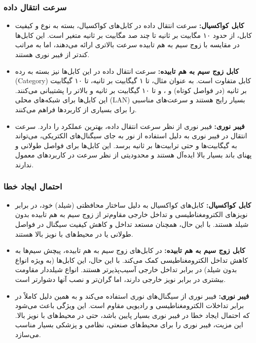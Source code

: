 

\subsubsection*{سرعت انتقال داده}

\begin{itemize}
	\item \textbf{کابل کواکسیال:} سرعت انتقال داده در کابل‌های کواکسیال، بسته به نوع و کیفیت کابل، از حدود ۱۰ مگابیت بر ثانیه تا چند صد مگابیت بر ثانیه متغیر است. این کابل‌ها در مقایسه با زوج سیم به هم تابیده سرعت بالاتری ارائه می‌دهند، اما به مراتب کندتر از فیبر نوری هستند.
	
	\item \textbf{کابل زوج سیم به هم تابیده:} سرعت انتقال داده در این کابل‌ها نیز بسته به رده (Category) کابل متفاوت است. به عنوان مثال،  تا ۱ گیگابیت بر ثانیه،  تا ۱۰ گیگابیت بر ثانیه (در فواصل کوتاه) و ،  و  تا ۱۰ گیگابیت بر ثانیه و بالاتر را پشتیبانی می‌کنند. این کابل‌ها برای شبکه‌های محلی (LAN) بسیار رایج هستند و سرعت‌های مناسبی را برای بسیاری از کاربردها فراهم می‌کنند.
	
	\item \textbf{فیبر نوری:} فیبر نوری از نظر سرعت انتقال داده، بهترین عملکرد را دارد. سرعت انتقال در فیبر نوری به دلیل استفاده از نور به جای سیگنال‌های الکتریکی، می‌تواند به گیگابیت‌ها و حتی ترابیت‌ها بر ثانیه برسد. این کابل‌ها برای فواصل طولانی و پهنای باند بسیار بالا ایده‌آل هستند و محدودیتی از نظر سرعت در کاربردهای معمول ندارند.
\end{itemize}

\subsubsection*{احتمال ایجاد خطا}

\begin{itemize}
	\item \textbf{کابل کواکسیال:} کابل‌های کواکسیال به دلیل ساختار محافظتی (شیلد) خود، در برابر نویزهای الکترومغناطیسی و تداخل خارجی مقاوم‌تر از زوج سیم به هم تابیده بدون شیلد هستند. با این حال، همچنان مستعد تداخل و کاهش کیفیت سیگنال در فواصل طولانی یا در محیط‌های با نویز بالا هستند.
	
	\item \textbf{کابل زوج سیم به هم تابیده:} در کابل‌های زوج سیم به هم تابیده، پیچش سیم‌ها به کاهش تداخل الکترومغناطیسی کمک می‌کند. 
	با این حال، این کابل‌ها (به ویژه انواع بدون شیلد) در برابر تداخل خارجی آسیب‌پذیرتر هستند. انواع شیلددار مقاومت بیشتری در برابر نویز خارجی دارند، اما گران‌تر و نصب آنها دشوارتر است.
	
	\item \textbf{فیبر نوری:} فیبر نوری از سیگنال‌های نوری استفاده می‌کند و به همین دلیل کاملاً در برابر تداخلات الکترومغناطیسی و رادیویی مقاوم است. این ویژگی باعث می‌شود که احتمال ایجاد خطا در فیبر نوری بسیار پایین باشد، حتی در محیط‌های با نویز بالا. این مزیت، فیبر نوری را برای محیط‌های صنعتی، نظامی و پزشکی بسیار مناسب می‌سازد.
\end{itemize}

